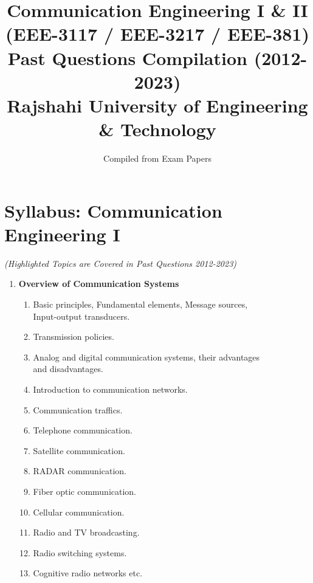 \documentclass[12pt, a4paper]{article}
\title{
	\Huge Communication Engineering I \& II \\
	\large (EEE-3117 / EEE-3217 / EEE-381) \\
	\vspace{0.5cm}
	\LARGE Past Questions Compilation (2012-2023) \\
	\vspace{0.2cm}
	\large Rajshahi University of Engineering \& Technology
}
\author{Compiled from Exam Papers}
\date{}
\newcommand{\hl}[1]{\colorbox{lgreen}{#1}}
\begin{document}
	
	\maketitle
	\thispagestyle{empty}
	\newpage
	\tableofcontents
	\newpage
	
	

	
	\section{Syllabus: Communication Engineering I}
		\large \textit{(Highlighted Topics are Covered in Past Questions 2012-2023)}
	\begin{enumerate}
		
		\item \textbf{Overview of Communication Systems}
		\begin{enumerate}[label*=\arabic*.]
			\item \hl{Basic principles, Fundamental elements, Message sources,}    \\ \hl{Input-output transducers.}
			\item Transmission policies.
			\item \hl{Analog and digital communication systems, their advantages}\\
				\hl{ and disadvantages.}
			\item \hl{Introduction to communication networks.}
			\item \hl{Communication traffics.}
			\item \hl{Telephone communication.}
			\item \hl{Satellite communication.}
			\item \hl{RADAR communication.}
			\item Fiber optic communication.
			\item \hl{Cellular communication.}
			\item \hl{Radio and TV broadcasting.}
			\item \hl{Radio switching systems.}
			\item Cognitive radio networks etc.
		\end{enumerate}
		

\end{enumerate}
\end{document}

